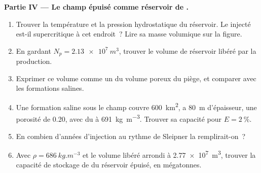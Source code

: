 \begin{problem}
\noindent\textbf{Partie IV --- Le champ épuisé comme réservoir de .}
\begin{enumerate}[resume]
  \item Trouver la température et la pression hydrostatique du réservoir. Le  injecté est-il supercritique
        à cet endroit~? Lire sa masse volumique sur la figure.
  \item En gardant $N_p = \qty{2.13e7}{m^3}$, trouver le volume de réservoir libéré par la production.
  \item Exprimer ce volume comme un  du volume poreux du piège, et comparer avec
        les formations salines.
  \item Une formation saline sous le champ couvre \qty{600}{km^2}, a \qty{80}{m} d'épaisseur, une porosité de
        0.20, avec du  à \qty{691}{kg.m^{-3}}. Trouver sa capacité pour $E =
        \qty{2}{\percent}$.
  \item En combien d'années d'injection au rythme de Sleipner la remplirait-on~?
  \item Avec $\rho = \qty{686}{kg.m^{-3}}$ et le volume libéré arrondi à \qty{2.77e7}{m^3}, trouver la
        capacité de stockage de  du réservoir épuisé, en mégatonnes.
\end{enumerate}
\end{problem}
